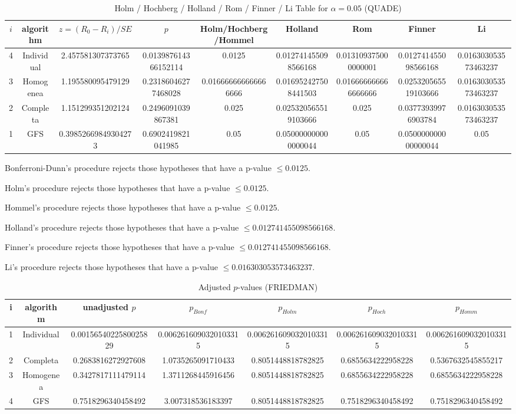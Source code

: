 \documentclass[a4paper,10pt]{article}
\begin{document}
\begin{landscape}
\begin{table}[!htp]
\centering\scriptsize
\caption{Holm / Hochberg / Holland / Rom / Finner / Li Table for $\alpha=0.05$ (QUADE)}
\begin{tabular}{ccccccccc}
$i$&algorithm&$z=(R_0 - R_i)/SE$&$p$&Holm/Hochberg/Hommel&Holland&Rom&Finner&Li\\
\hline
4&Individual&2.457581307373765&0.013987614366152114&0.0125&0.012741455098566168&0.013109375000000001&0.012741455098566168&0.016303053573463237\\
3&Homogenea&1.195580095479129&0.23186046277468028&0.016666666666666666&0.016952427508441503&0.016666666666666666&0.025320565519103666&0.016303053573463237\\
2&Completa&1.151299351202124&0.2496091039867381&0.025&0.025320565519103666&0.025&0.03773939976903784&0.016303053573463237\\
1&GFS&0.39852669849304273&0.6902419821041985&0.05&0.050000000000000044&0.05&0.050000000000000044&0.05\\
\hline
\end{tabular}
\end{table}
Bonferroni-Dunn's procedure rejects those hypotheses that have a p-value $\le0.0125$.


Holm's procedure rejects those hypotheses that have a p-value $\le0.0125$.


Hommel's procedure rejects those hypotheses that have a p-value $\le0.0125$.


Holland's procedure rejects those hypotheses that have a p-value $\le0.012741455098566168$.


Finner's procedure rejects those hypotheses that have a p-value $\le0.012741455098566168$.


Li's procedure rejects those hypotheses that have a p-value $\le0.016303053573463237$.



\newpage

\begin{table}[!htp]
\centering\scriptsize
\caption{Adjusted $p$-values (FRIEDMAN)}
\begin{tabular}{ccccccc}
i&algorithm&unadjusted $p$&$p_{Bonf}$&$p_{Holm}$&$p_{Hoch}$&$p_{Homm}$\\
\hline
1&Individual&0.0015654022580025829&0.0062616090320103315&0.0062616090320103315&0.0062616090320103315&0.0062616090320103315\\
2&Completa&0.2683816272927608&1.0735265091710433&0.8051448818782825&0.6855634222958228&0.5367632545855217\\
3&Homogenea&0.3427817111479114&1.3711268445916456&0.8051448818782825&0.6855634222958228&0.6855634222958228\\
4&GFS&0.7518296340458492&3.007318536183397&0.8051448818782825&0.7518296340458492&0.7518296340458492\\
\hline
\end{tabular}
\end{table}


\end{landscape}
\end{document}
